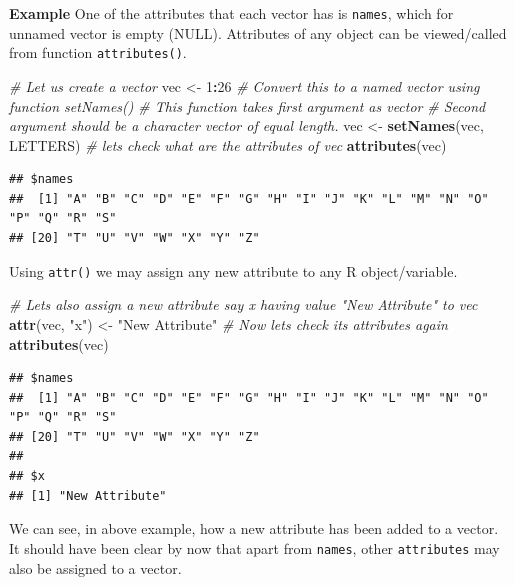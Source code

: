 \documentclass[
]{book}
\newenvironment{Shaded}{\begin{snugshade}}{\end{snugshade}}
\newcommand{\CommentTok}[1]{\textcolor[rgb]{0.56,0.35,0.01}{\textit{#1}}}
\newcommand{\DecValTok}[1]{\textcolor[rgb]{0.00,0.00,0.81}{#1}}
\newcommand{\FunctionTok}[1]{\textcolor[rgb]{0.13,0.29,0.53}{\textbf{#1}}}
\newcommand{\NormalTok}[1]{#1}
\newcommand{\OtherTok}[1]{\textcolor[rgb]{0.56,0.35,0.01}{#1}}
\newcommand{\SpecialCharTok}[1]{\textcolor[rgb]{0.81,0.36,0.00}{\textbf{#1}}}
\newcommand{\StringTok}[1]{\textcolor[rgb]{0.31,0.60,0.02}{#1}}
\begin{document}
\textbf{Example} One of the attributes that each vector has is \texttt{names}, which for unnamed vector is empty (NULL). Attributes of any object can be viewed/called from function \texttt{attributes()}.

\begin{Shaded}
\begin{Highlighting}[]
\CommentTok{\# Let us create a vector}
\NormalTok{vec }\OtherTok{\textless{}{-}} \DecValTok{1}\SpecialCharTok{:}\DecValTok{26}
\CommentTok{\# Convert this to a named vector using function setNames()}
\CommentTok{\# This function takes first argument as vector}
\CommentTok{\# Second argument should be a character vector of equal length.}
\NormalTok{vec }\OtherTok{\textless{}{-}} \FunctionTok{setNames}\NormalTok{(vec, LETTERS)}
\CommentTok{\# let\textquotesingle{}s check what are the attributes of \textasciigrave{}vec\textasciigrave{}}
\FunctionTok{attributes}\NormalTok{(vec)}
\end{Highlighting}
\end{Shaded}

\begin{verbatim}
## $names
##  [1] "A" "B" "C" "D" "E" "F" "G" "H" "I" "J" "K" "L" "M" "N" "O" "P" "Q" "R" "S"
## [20] "T" "U" "V" "W" "X" "Y" "Z"
\end{verbatim}

Using \texttt{attr()} we may assign any new attribute to any R object/variable.

\begin{Shaded}
\begin{Highlighting}[]
\CommentTok{\# Let\textquotesingle{}s also assign a new attribute say \textasciigrave{}x\textasciigrave{} having value "New Attribute" to \textasciigrave{}vec\textasciigrave{}}
\FunctionTok{attr}\NormalTok{(vec, }\StringTok{"x"}\NormalTok{) }\OtherTok{\textless{}{-}} \StringTok{"New Attribute"}
\CommentTok{\# Now let\textquotesingle{}s check its attributes again}
\FunctionTok{attributes}\NormalTok{(vec)}
\end{Highlighting}
\end{Shaded}

\begin{verbatim}
## $names
##  [1] "A" "B" "C" "D" "E" "F" "G" "H" "I" "J" "K" "L" "M" "N" "O" "P" "Q" "R" "S"
## [20] "T" "U" "V" "W" "X" "Y" "Z"
## 
## $x
## [1] "New Attribute"
\end{verbatim}

We can see, in above example, how a new attribute has been added to a vector. It should have been clear by now that apart from \texttt{names}, other \texttt{attributes} may also be assigned to a vector.
\end{document}
